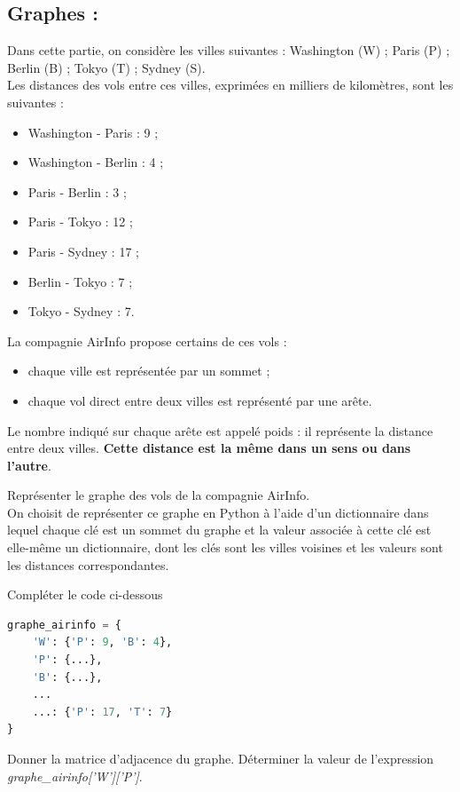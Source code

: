 \documentclass[a4paper, noanswers, addpoints, 12pt]{exam}
\begin{document}
\begin{questions}
\section{Graphes : }

Dans cette partie, on considère les villes suivantes : Washington (W) ; Paris (P) ; Berlin
(B) ; Tokyo (T) ; Sydney (S).\\
Les distances des vols entre ces villes, exprimées en milliers de kilomètres, sont les
suivantes :
\begin{itemize}
\item Washington - Paris : 9 ;
\item Washington - Berlin : 4 ;
\item Paris - Berlin : 3 ;
\item Paris - Tokyo : 12 ;
\item Paris - Sydney : 17 ;
\item Berlin - Tokyo : 7 ;
\item Tokyo - Sydney : 7.
\end{itemize}


La compagnie AirInfo propose certains de ces vols :
\begin{itemize}
    \item chaque ville est représentée par un sommet ;
    \item chaque vol direct entre deux villes est représenté par une arête.
\end{itemize}
Le nombre indiqué sur chaque arête est appelé poids : il représente la distance entre
deux villes. \textbf{Cette distance est la même dans un sens ou dans l'autre}.

\question[1] Représenter le graphe des vols de la compagnie AirInfo.\\

On choisit de représenter ce graphe en Python à l'aide d'un dictionnaire dans lequel
chaque clé est un sommet du graphe et la valeur associée à cette clé est elle-même
un dictionnaire, dont les clés sont les villes voisines et les valeurs sont les distances
correspondantes.

\question[1] Compléter le code ci-dessous
\begin{lstlisting}[style=mystyle, language=Python]
 graphe_airinfo = {
    'W': {'P': 9, 'B': 4},
    'P': {...},
    'B': {...},
    ...
    ...: {'P': 17, 'T': 7}
}
\end{lstlisting}
\question[1] Donner la matrice d'adjacence du graphe.
\question[1] Déterminer la valeur de l'expression \textit{graphe\_airinfo['W']['P']}.


\end{questions}
\end{document}
